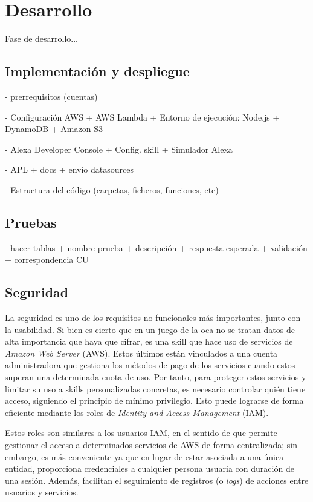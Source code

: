 \section{Desarrollo}
Fase de desarrollo...

\subsection{Implementación y despliegue}

- prerrequisitos (cuentas)

- Configuración AWS
+ AWS Lambda
+ Entorno de ejecución: Node.js
+ DynamoDB
+ Amazon S3

- Alexa Developer Console
+ Config. skill
+ Simulador Alexa

- APL
+ docs
+ envío datasources

- Estructura del código (carpetas, ficheros, funciones, etc)

\subsection{Pruebas}
- hacer tablas
+ nombre prueba
+ descripción
+ respuesta esperada
+ validación
+ correspondencia CU

\subsection{Seguridad}

La seguridad es uno de los requisitos no funcionales más importantes, junto con la usabilidad. Si bien es cierto que en un juego de la oca no se tratan datos de alta importancia que haya que cifrar, es una skill que hace uso de servicios de \textit{Amazon Web Server} (AWS). Estos últimos están vinculados a una cuenta administradora que gestiona los métodos de pago de los servicios cuando estos superan una determinada cuota de uso. Por tanto, para proteger estos servicios y limitar su uso a skills personalizadas concretas, es necesario controlar quién tiene acceso, siguiendo el principio de mínimo privilegio. Esto puede lograrse de forma eficiente mediante los roles de \textit{Identity and Access Management} (IAM).

Estos roles son similares a los usuarios IAM, en el sentido de que permite gestionar el acceso a determinados servicios de AWS de forma centralizada; sin embargo, es más conveniente ya que en lugar de estar asociada a una única entidad, proporciona credenciales a cualquier persona usuaria con duración de una sesión. Además, facilitan el seguimiento de registros (o \textit{logs}) de acciones entre usuarios y servicios.

